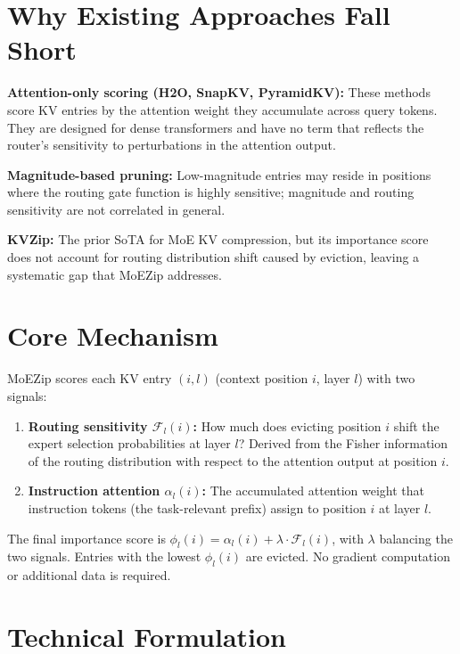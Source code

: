 \documentclass[10pt,twocolumn]{article}
\begin{document}
\section{Why Existing Approaches Fall Short}

\textbf{Attention-only scoring (H2O, SnapKV, PyramidKV):}
These methods score KV entries by the attention weight they accumulate across
query tokens. They are designed for dense transformers and have no term that
reflects the router's sensitivity to perturbations in the attention output.

\textbf{Magnitude-based pruning:}
Low-magnitude entries may reside in positions where the routing gate
function is highly sensitive; magnitude and routing sensitivity are not
correlated in general.

\textbf{KVZip:}
The prior SoTA for MoE KV compression, but its importance score does not
account for routing distribution shift caused by eviction, leaving a
systematic gap that MoEZip addresses.

\section{Core Mechanism}

MoEZip scores each KV entry $(i, l)$ (context position $i$, layer $l$) with
two signals:

\begin{enumerate}[itemsep=2pt,parsep=0pt]
  \item \textbf{Routing sensitivity $\mathcal{F}_l(i)$:} How much does
    evicting position $i$ shift the expert selection probabilities at layer $l$?
    Derived from the Fisher information of the routing distribution with respect
    to the attention output at position $i$.
  \item \textbf{Instruction attention $\alpha_l(i)$:} The accumulated attention
    weight that instruction tokens (the task-relevant prefix) assign to
    position $i$ at layer $l$.
\end{enumerate}

The final importance score is $\phi_l(i) = \alpha_l(i) + \lambda \cdot \mathcal{F}_l(i)$,
with $\lambda$ balancing the two signals. Entries with the lowest $\phi_l(i)$ are
evicted. No gradient computation or additional data is required.

\section{Technical Formulation}
\end{document}
